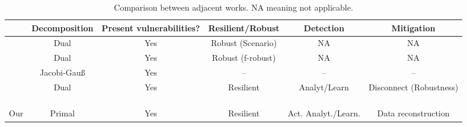 \documentclass[../main.tex]{subfiles}
\begin{document}
\begin{landscape}
  \vspace*{\fill}
\begin{table}[H]
  \centering
  \begin{tabular}[h]{lccccc}
    \toprule
     & Decomposition & Present vulnerabilities?  & Resilient/Robust & Detection & Mitigation\\
    \midrule
    \cite{VelardeEtAl2017a} & Dual & Yes & Robust (Scenario) & NA & NA\\
    \parbox{20pt}{\cite{VelardeEtAl2017b} \\ \cite{VelardeEtAl2018}} & Dual & Yes & Robust (f-robust) & NA & NA\\
    \cite{ChanfreutEtAl2018} & Jacobi-Gauß & Yes & -- & -- & --\\
    \parbox{40pt}{\cite{AnandutaEtAl2018}\\\cite{AnandutaEtAl2019}\\\cite{AnandutaEtAl2020}} & Dual & Yes & Resilient& Analyt/Learn & Disconnect (Robustness)\\
    Our & Primal & Yes & Resilient & Act. Analyt./Learn. & Data reconstruction\\
    \bottomrule
  \end{tabular}
  \caption[Comparison between adjacent works]{Comparison between adjacent works. NA meaning not applicable.}\label{tab:compare_works}
\end{table}
  \vspace*{\fill}
\end{landscape}
\end{document}
